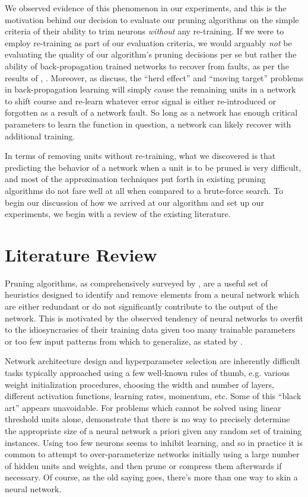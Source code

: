 We observed evidence of this phenomenon in our experiments, and this is the motivation behind our decision to evaluate our pruning algorithms on the simple criteria of their ability to trim neurons \textit{without} any re-training. If we were to employ re-training as part of our evaluation criteria, we would arguably \textit{not} be evaluating the quality of our algorithm's pruning decisions per se but rather the ability of back-propagation trained networks to recover from faults, as per the results of \cite{segee1991fault},  \cite{mozer1989skeletonization}. Moreover, as \cite{fahlman1989cascade} discuss, the ``herd effect'' and ``moving target'' problems in back-propagation learning will simply cause the remaining units in a network to shift course and re-learn whatever error signal is either re-introduced or forgotten as a result of a network fault. So long as a network has enough critical parameters to learn the function in question, a network can likely recover with additional training. 

In terms of removing units without re-training, what we discovered is that predicting the behavior of a network when a unit is to be pruned is very difficult, and most of the approximation techniques put forth in existing pruning algorithms do not fare well at all when compared to a brute-force search. To begin our discussion of how we arrived at our algorithm and set up our experiments, we begin with a review of the existing literature.


\section{Literature Review}
Pruning algorithms, as comprehensively surveyed by \cite{reed1993pruning}, are a useful set of heuristics designed to identify and remove elements from a neural network which are either redundant or do not significantly contribute to the output of the network. This is motivated by the observed tendency of neural networks to overfit to the idiosyncrasies of their training data given too many trainable parameters or too few input patterns from which to generalize, as stated by \cite{chauvin1990generalization}. 

Network architecture design and hyperparameter selection are inherently difficult tasks typically approached using a few well-known rules of thumb, e.g. various weight initialization procedures, choosing the width and number of layers, different activation functions, learning rates, momentum, etc. Some of this ``black art'' appears unavoidable. For problems which cannot be solved using linear threshold units alone, \cite{baum1989size} demonstrate that there is no way to precisely determine the appropriate size of a neural network a priori given any random set of training instances. Using too few neurons seems to inhibit learning, and so in practice it is common to attempt to over-parameterize networks initially using a large number of hidden units and weights, and then prune or compress them afterwards if necessary. Of course, as the old saying goes, there's more than one way to skin a neural network. 

